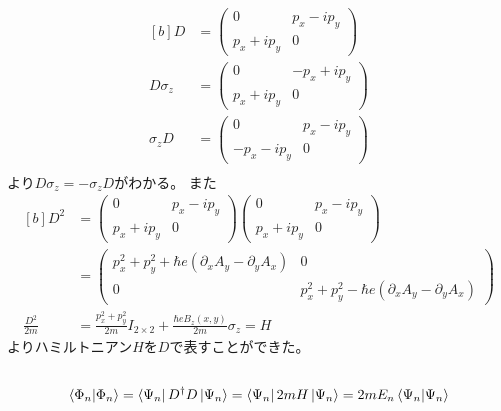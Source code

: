 \documentclass[../../sp_2015.tex]{subfiles}
\begin{document}
\subsection{}
\begin{equation}\begin{aligned}[b]
    D &= \begin{pmatrix}
        0 & p_x-ip_y\\p_x+ip_y & 0
    \end{pmatrix}\\
    D\sigma_z &= \begin{pmatrix}
        0 & -p_x+ip_y\\p_x+ip_y & 0
    \end{pmatrix}\\
    \sigma_zD &= \begin{pmatrix}
        0 & p_x-ip_y\\-p_x-ip_y & 0
    \end{pmatrix}\\
\end{aligned}\end{equation}
より\(D\sigma_z=-\sigma_z D\)がわかる。
また
\begin{equation}\begin{aligned}[b]
    D^2 &= \begin{pmatrix}
        0 & p_x-ip_y\\p_x+ip_y & 0
    \end{pmatrix}\begin{pmatrix}
        0 & p_x-ip_y\\p_x+ip_y & 0
    \end{pmatrix}\\
    &=\begin{pmatrix}
        p_x^2+p_y^2 +\hbar e(\partial_xA_y-\partial_yA_x)& 0\\ 0 & p_x^2+p_y^2-\hbar e(\partial_xA_y-\partial_yA_x)
    \end{pmatrix}\\
    \frac{D^2}{2m}&=\frac{p_x^2+p_y^2}{2m}I_{2\times2}+\frac{\hbar eB_z(x,y)}{2m}\sigma_z = H
\end{aligned}\end{equation}
よりハミルトニアン\(H\)を\(D\)で表すことができた。

\subsection{}
\begin{equation}\begin{aligned}[b]
    \braket{\Phi_n}
    =\bra{\Psi_n}D^\dagger D\ket{\Psi_n}
    =\bra{\Psi_n}2mH\ket{\Psi_n}
    =2mE_n\braket{\Psi_n}
\end{aligned}\end{equation}
\end{document}
